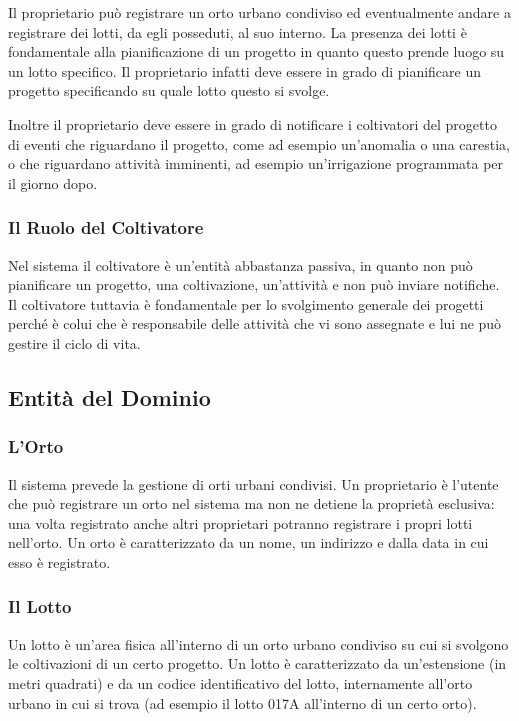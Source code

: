 \documentclass[12pt,a4paper]{article}
\begin{document}
Il proprietario può registrare un orto urbano condiviso ed eventualmente andare a registrare dei lotti, da egli posseduti, al suo interno. La presenza dei lotti è fondamentale alla pianificazione di un progetto in quanto questo prende luogo su un lotto specifico. Il proprietario infatti deve essere in grado di pianificare un progetto specificando su quale lotto questo si svolge. 

Inoltre il proprietario deve essere in grado di notificare i coltivatori del progetto di eventi che riguardano il progetto, come ad esempio un'anomalia o una carestia, o che riguardano attività imminenti, ad esempio un'irrigazione programmata per il giorno dopo.

\subsubsection{Il Ruolo del Coltivatore}

Nel sistema il coltivatore è un'entità abbastanza passiva, in quanto non può pianificare un progetto, una coltivazione, un'attività e non può inviare notifiche. Il coltivatore tuttavia è fondamentale per lo svolgimento generale dei progetti perché è colui che è responsabile delle attività che vi sono assegnate e lui ne può gestire il ciclo di vita.

\subsection{Entità del Dominio}

\subsubsection{L'Orto}

Il sistema prevede la gestione di orti urbani condivisi. Un proprietario è l'utente che può registrare un orto nel sistema ma non ne detiene la proprietà esclusiva: una volta registrato anche altri proprietari potranno registrare i propri lotti nell'orto. Un orto è caratterizzato da un nome, un indirizzo e dalla data in cui esso è registrato.

\subsubsection{Il Lotto}

Un lotto è un'area fisica all'interno di un orto urbano condiviso su cui si svolgono le coltivazioni di un certo progetto. Un lotto è caratterizzato da un'estensione (in metri quadrati) e da un codice identificativo del lotto, internamente all'orto urbano in cui si trova (ad esempio il lotto 017A all'interno di un certo orto). 
\end{document}
